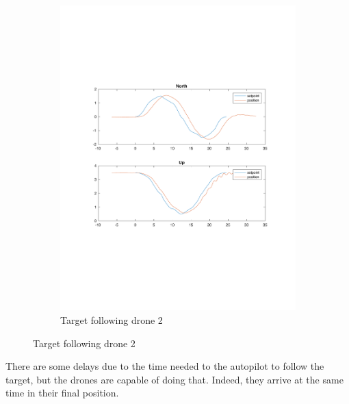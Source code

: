 \begin{figure}
\begin{subfigure}[b]{0.8\textwidth}
   \includegraphics[width=1\linewidth]{chapters/chapter-04/figures/following_2.pdf}
   \caption{Target following drone 2}
   \label{fig:following_2}
\end{subfigure}
\end{figure}

There are some delays due to the time needed to the autopilot to follow
the target, but the drones are capable of doing that.
Indeed, they arrive at the same time in their final position.

